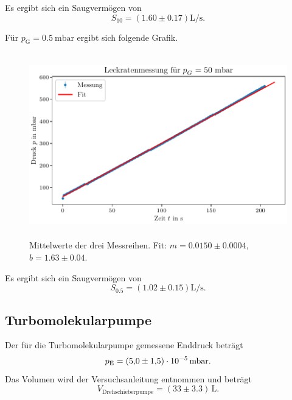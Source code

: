 Es ergibt sich ein Saugvermögen von
\begin{equation}
    S_{10} = (\num{1.60} \pm \num{0.17}) \si{\liter\per\second}.
\end{equation}

Für $p_\text{G} = \SI{0.5}{\milli\bar}$ ergibt sich folgende Grafik.

\begin{figure}[H]
    \centering
    \includegraphics[width=\textwidth,height=8cm]{plots/DP_Leck_50mbar.pdf}
    \caption{Mittelwerte der drei Messreihen. Fit: $m = \num{0.0150} \pm \num{0.0004}$, $b = \num{1.63} \pm \num{0.04}$.}
    \label{fig:DP_Leck_05mbar_mittelwert}
\end{figure}

Es ergibt sich ein Saugvermögen von
\begin{equation}
    S_{\num{0.5}} = (\num{1.02} \pm \num{0.15}) \si{\liter\per\second}.
\end{equation}

\subsection{Turbomolekularpumpe}

Der für die Turbomolekularpumpe gemessene Enddruck beträgt
\begin{equation}
    p_\text{E} = (\num{5.0} \pm \num{1.5}) \cdot 10^{-5} \, \si{\milli\bar}.\\
\end{equation}
Das Volumen wird der Versuchsanleitung entnommen und beträgt
\begin{equation}
    V_\text{Drehschieberpumpe} = (\num{33} \pm \num{3.3}) \, \si{\liter}.
\end{equation}


